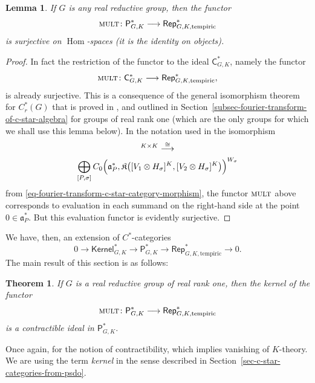 \documentclass[leqno,11pt]{amsart}
\numberwithin{equation}{subsection}
\theoremstyle{plain}
\newtheorem{theorem}[equation]{Theorem}
\newtheorem{lemma}[equation]{Lemma}
\theoremstyle{definition}
\theoremstyle{remark}
\newcommand{\tempiric}{\mathrm{tempiric}}
\newcommand{\PSDO}{\mathsf{P}}
\newcommand{\CC}{\mathsf{C}}
\newcommand{\Rep}{\mathsf{Rep}}
\DeclareMathOperator{\Hom}{Hom}
\newcommand{\mult}{{\textsc{\textsf{mult}}}}
\begin{document}
 

\begin{lemma}
If $G$ is any real reductive group, then the functor 
\[
\mult \colon \PSDO^*_{G,K} \longrightarrow \Rep^*_{G,K,\tempiric }
\]
is surjective on $\Hom$-spaces \textup{(}it is the identity on objects\textup{)}. 
\end{lemma}


\begin{proof} 
In fact the restriction of the functor to the ideal $\CC^*_{G,K}$, namely the functor 
\[
\mult \colon \CC^*_{G,K} \longrightarrow \Rep^*_{G,K,\tempiric }, 
\]
is already surjective.  This is a consequence of the general isomorphism theorem for $C^*_r(G)$ that is proved in \cite{ClareCrispHigson16}, and outlined in Section~\ref{subsec-fourier-transform-of-c-star-algebra} for groups of real rank one (which are the only groups for which we shall use this lemma below). In the notation used in the isomorphism 
\begin{multline*}
[ C_r^*(G) \otimes \operatorname{Hom}(V_1,V_2) ]^{K \times K}\stackrel \cong \longrightarrow 
\\
\bigoplus _{[P,\sigma]}
C_0\Bigl  (\mathfrak{a}^*_P, \mathfrak{K}\bigl ([V_1\otimes H_\sigma]^K,[V_2\otimes H_\sigma]^K\bigr )\Bigr ) ^{W_\sigma}
\end{multline*}
from \eqref{eq-fourier-transform-c-star-category-morphism}, the functor $\mult$ above corresponds to evaluation in each summand on the right-hand side at the point $0\in \mathfrak {a}^*_P$. But this evaluation functor is evidently surjective.
\end{proof} 

We have, then, an extension of $C^*$-categories
\[
0\longrightarrow 
\mathsf{Kernel}^*_{G,K} \longrightarrow 
\PSDO^*_{G,K} \longrightarrow \Rep^*_{G,K,\tempiric }
\longrightarrow 0 .
\]
The main result of this section is as  follows:

\begin{theorem}
    \label{thm-homotopy-equivalence}
If $G$ is a real reductive group of real rank one, then the kernel of the functor 
\[
\mult \colon \PSDO^*_{G,K} \longrightarrow \Rep^*_{G,K,\tempiric }
\]
is a contractible ideal in $\PSDO^*_{G,K}$. 
\end{theorem}

Once again, \cite[Sec.\,3]{MitchenerKTheory01}  for the notion of contractibility, which implies vanishing of $K$-theory. We are using the term \emph{kernel} in the sense described in Section~\ref{sec-c-star-categories-from-psdo}. 
\end{document}

